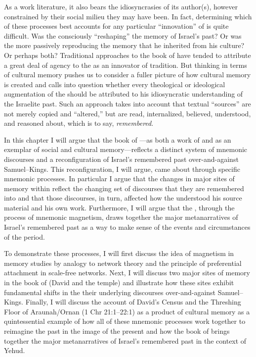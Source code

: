 As a work literature, it also bears the idiosyncrasies of its author(s), however constrained by their social milieu they may have been. In fact, determining which of these processes best accounts for any particular ``innovation'' of \chronicles is quite difficult. Was the \chronicler consciously ``reshaping'' the memory of Israel's past? Or was the \chronicler more passively reproducing the memory that he inherited from his culture? Or perhaps both? Traditional approaches to the book of \chronicles have tended to attribute a great deal of agency to the \chronicler as an innovator of tradition. But thinking in terms of cultural memory pushes us to consider a fuller picture of how cultural memory is created and calls into question whether every theological or ideological augmentation of the \chronicler should be attributed to his idiosyncratic understanding of the Israelite past. Such an approach takes into account that textual ``sources'' are not merely copied and ``altered,'' but are read, internalized, believed, understood, and reasoned about, which is to say, \emph{remembered}.

In this chapter I will argue that the book of \chronicles---as both a work of \rwb and as an exemplar of social and cultural memory---reflects a distinct system of mnemonic discourses and a reconfiguration of Israel's remembered past over-and-against Samuel--Kings. This reconfiguration, I will argue, came about through specific mnemonic processes. In particular I argue that the changes in major sites of memory within \chronicles reflect the changing set of discourses that they are remembered into and that those discourses, in turn, affected how the \chronicler understood his source material and his own work. Furthermore, I will argue that the \chronicler, through the process of mnemonic magnetism, draws together the major metanarratives of Israel's remembered past as a way to make sense of the events and circumstances of the \secondtemple period.

To demonstrate these processes, I will first discuss the idea of magnetism in memory studies by analogy to network theory and the principle of preferential attachment in scale-free networks. Next, I will discuss two major sites of memory in the book of \chronicles (David and the temple) and illustrate how these sites exhibit fundamental shifts in the their underlying discourses over-and-against Samuel--Kings. Finally, I will discuss the account of David's Census and the Threshing Floor of Araunah/Ornan (1 Chr 21:1--22:1) as a product of cultural memory as a quintessential example of how all of these mnemonic processes work together to reimagine the past in the image of the present and how the book of \chronicles brings together the major metanarratives of Israel's remembered past in the context of \secondtemple Yehud.

